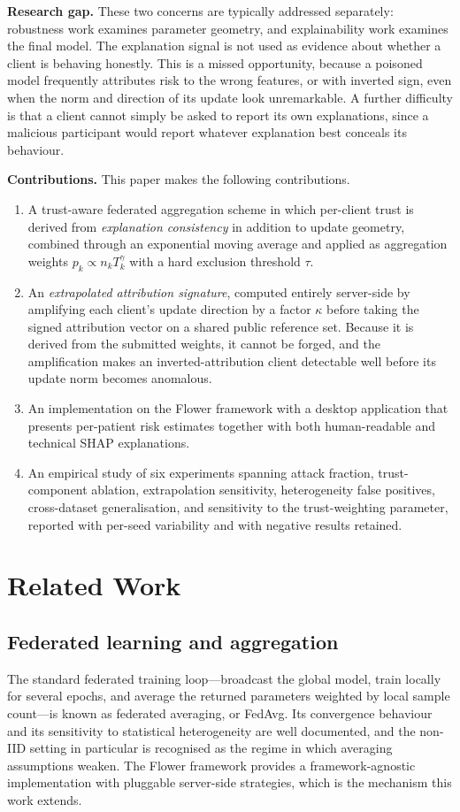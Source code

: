 \documentclass[conference]{IEEEtran}
\begin{document}
\textbf{Research gap.} These two concerns are typically addressed
separately: robustness work examines parameter geometry, and explainability
work examines the final model. The explanation signal is not used as evidence
about whether a client is behaving honestly. This is a missed opportunity,
because a poisoned model frequently attributes risk to the wrong features, or
with inverted sign, even when the norm and direction of its update look
unremarkable. A further difficulty is that a client cannot simply be asked to
report its own explanations, since a malicious participant would report
whatever explanation best conceals its behaviour.

\textbf{Contributions.} This paper makes the following contributions.
\begin{enumerate}
 \item A trust-aware federated aggregation scheme in which per-client trust
 is derived from \emph{explanation consistency} in addition to update
 geometry, combined through an exponential moving average and applied
 as aggregation weights $p_k \propto n_k T_k^{\gamma}$ with a hard
 exclusion threshold $\tau$.
 \item An \emph{extrapolated attribution signature}, computed entirely
 server-side by amplifying each client's update direction by a factor
 $\kappa$ before taking the signed attribution vector on a shared
 public reference set. Because it is derived from the submitted
 weights, it cannot be forged, and the amplification makes an
 inverted-attribution client detectable well before its update norm
 becomes anomalous.
 \item An implementation on the Flower framework
 with a desktop application that presents
 per-patient risk estimates together with both human-readable and
 technical SHAP explanations.
 \item An empirical study of six experiments spanning attack fraction,
 trust-component ablation, extrapolation sensitivity, heterogeneity
 false positives, cross-dataset generalisation, and sensitivity to
 the trust-weighting parameter, reported with per-seed variability
 and with negative results retained.
\end{enumerate}

\section{Related Work}

\subsection{Federated learning and aggregation}
The standard federated training loop---broadcast the global model, train
locally for several epochs, and average the returned parameters weighted by
local sample count---is known as federated averaging, or FedAvg. Its
convergence behaviour and its sensitivity to statistical heterogeneity are
well documented, and the non-IID setting in particular is recognised as the
regime in which averaging assumptions weaken. The Flower framework provides a
framework-agnostic implementation with pluggable server-side strategies, which
is the mechanism this work extends.
\end{document}

